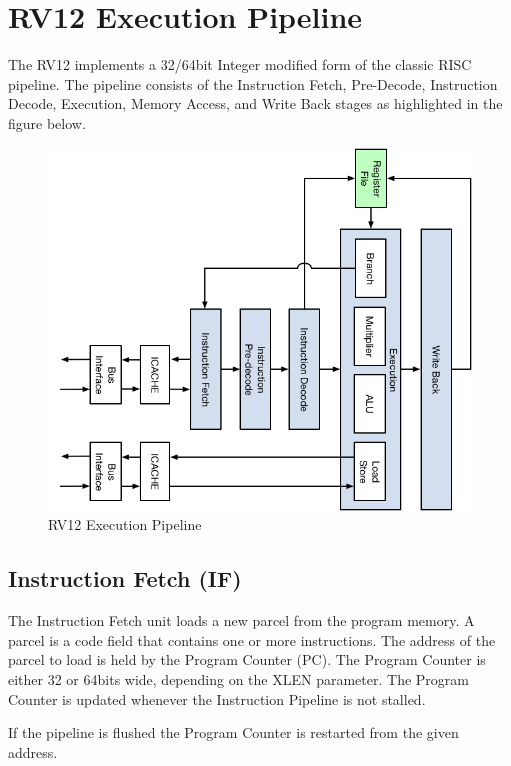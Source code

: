 \chapter{RV12 Execution Pipeline}

The RV12 implements a 32/64bit Integer modified form of the classic RISC pipeline.
The pipeline consists of the Instruction Fetch, Pre-Decode, Instruction Decode, Execution, Memory Access, and Write Back stages as highlighted in the figure below.


\begin{figure}[h]
  \includegraphics{assets/img/Pipeline-Overview}
  \caption{RV12 Execution Pipeline}
\end{figure}

\pagebreak

\section{Instruction Fetch (IF)}\label{instr-fetch-if}

The Instruction Fetch unit loads a new parcel from the program memory.
A parcel is a code field that contains one or more instructions.
The address of the parcel to load is held by the Program Counter (PC).
The Program Counter is either 32 or 64bits wide, depending on the XLEN parameter.
The Program Counter is updated whenever the Instruction Pipeline is not stalled.

If the pipeline is flushed the Program Counter is restarted from the given address.

